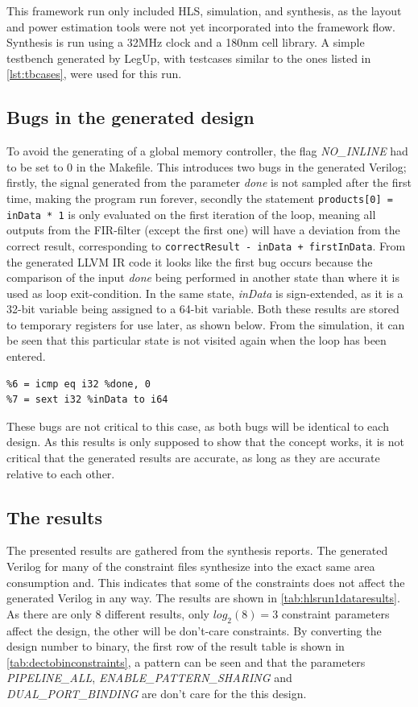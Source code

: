 This framework run only included HLS, simulation, and synthesis, as the layout and power estimation tools were not yet incorporated into the framework flow. Synthesis is run using a 32MHz clock and a 180nm cell library. A simple testbench generated by LegUp, with testcases similar to the ones listed in \cref{lst:tbcases}, were used for this run. 
\subsection{Bugs in the generated design}
To avoid the generating of a global memory controller, the flag \textit{NO\_INLINE} had to be set to 0 in the Makefile. This introduces two bugs in the generated Verilog; firstly, the signal generated from the parameter \textit{done} is not sampled after the first time, making the program run forever, secondly the statement \verb!products[0] = inData * 1! is only evaluated on the first iteration of the loop, meaning all outputs from the FIR-filter (except the first one) will have a deviation from the correct result, corresponding to \verb!correctResult - inData + firstInData!. From the generated LLVM IR code it looks like the first bug occurs because the comparison of the input \textit{done} being performed in another state than where it is used as loop exit-condition. In the same state, \textit{inData} is sign-extended, as it is a 32-bit variable being assigned to a 64-bit variable. Both these results are stored to temporary registers for use later, as shown below. From the simulation, it can be seen that this particular state is not visited again when the loop has been entered.
\lstset{language=llvm,style=LLVMstyle}
\begin{lstlisting}
%6 = icmp eq i32 %done, 0
%7 = sext i32 %inData to i64
\end{lstlisting}
These bugs are not critical to this case, as both bugs will be identical to each design. As this results is only supposed to show that the concept works, it is not critical that the generated results are accurate, as long as they are accurate relative to each other.
\subsection{The results}
The presented results are gathered from the synthesis reports. The generated Verilog for many of the constraint files synthesize into the exact same area consumption and. This indicates that some of the constraints does not affect the generated Verilog in any way. The results are shown in \cref{tab:hlsrun1dataresults}. As there are only 8 different results, only $log_2(8) = 3$ constraint parameters affect the design, the other will be don't-care constraints. By converting the design number to binary, the first row of the result table is shown in \cref{tab:dectobinconstraints}, a pattern can be seen and that the parameters \textit{PIPELINE\_ALL}, \textit{ENABLE\_PATTERN\_SHARING} and \textit{DUAL\_PORT\_BINDING} are don't care for the this design.


